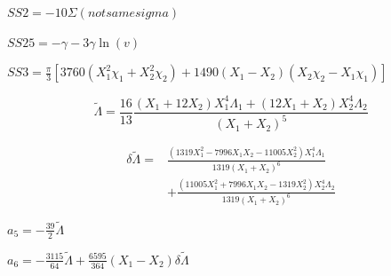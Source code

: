 \documentclass[prd,aps,letter,twocolumn,floatfix,notitlepage,nofootinbib]{revtex4-1}
\begin{document}
$SS2 = -10 \Sigma (not same sigma)$

$SS25 = -\gamma -3\gamma\ln(v)$

$SS3 = \frac{\pi}{3}\left[3760(X_1^2\chi_1 + X_2^2\chi_2) + 1490(X_1-X_2)(X_2\chi_2 - X_1\chi_1)\right]$

\begin{equation}
\tilde\Lambda = \frac{16}{13} \frac{(X_1+12X_2)X_1^4\Lambda_1 + (12X_1+X_2)X_2^4\Lambda_2}{(X_1+X_2)^5}
\end{equation}

\begin{align}
\delta\tilde\Lambda =& \frac{(1319X_1^2 - 7996X_1X_2 - 11005X_2^2)X_1^4\Lambda_1}{1319(X_1+X_2)^6} \\
& + \frac{(11005X_1^2 + 7996X_1X_2 - 1319X_2^2)X_2^4\Lambda_2}{1319(X_1+X_2)^6}
\end{align}

$a_5 = -\frac{39}{2}\tilde\Lambda$

$a_6 = -\frac{3115}{64}\tilde\Lambda + \frac{6595}{364}(X_1-X_2)\delta\tilde\Lambda$


  
\end{document}
